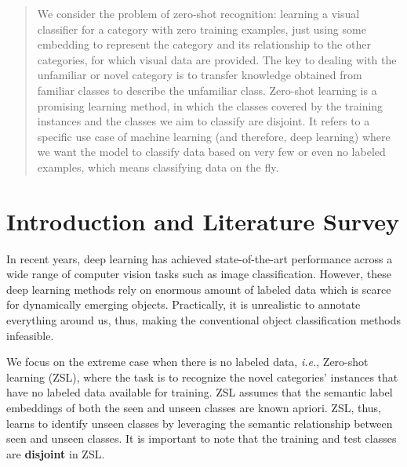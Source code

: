 \documentclass{article}
\begin{document}
\printAffiliationsAndNotice{}


\begin{abstract}
We consider the problem of zero-shot recognition: learning a visual classifier for a category with zero training examples, 
just using some embedding to represent the category and its relationship to the other categories, for which visual data are provided. 
The key to dealing with the unfamiliar or novel category is to transfer knowledge obtained from familiar classes to describe the unfamiliar class. 
Zero-shot learning is a promising learning method, in which the classes covered by the training instances and the classes we aim to classify are disjoint. 
It refers to a specific use case of machine learning (and therefore, deep learning) where we want the model to classify data based on very few or even no labeled examples, 
which means classifying data on the fly.
\end{abstract}


\section{Introduction and Literature Survey}
In recent years, deep learning has achieved state-of-the-art performance across a wide range of computer vision tasks such as image classification. 
However, these deep learning methods rely on enormous amount of labeled data which is scarce for dynamically emerging objects. 
Practically, it is unrealistic to annotate everything around us, thus, making the conventional object classification methods infeasible. 

We focus on the extreme case when there is no labeled data, \textit{i.e.}, Zero-shot learning (ZSL), 
where the task is to recognize the novel categories' instances that have no labeled data available for training. 
ZSL assumes that the semantic label embeddings of both the seen and unseen classes are known apriori. 
ZSL, thus, learns to identify unseen classes by leveraging the semantic relationship between seen and unseen classes. 
It is important to note that the training and test classes are \textbf{disjoint} in ZSL.
\end{document}

